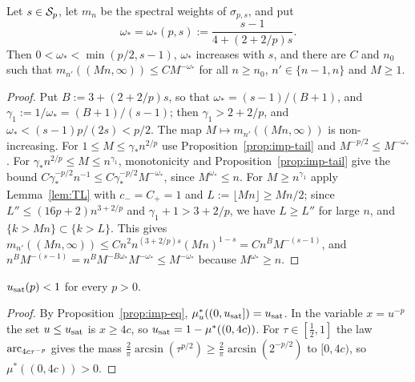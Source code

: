 \begin{lemma}\label{lem:allM}
Let $s\in\mathcal{S}_p$, let $m_n$ be the spectral weights of $\sigma_{p,s}$, and put
\[
  \omega_*=\omega_*(p,s):=\frac{s-1}{4+(2+2/p)s}.
\]
Then $0<\omega_*<\min(p/2,s-1)$, $\omega_*$ increases with $s$, and there are $C$ and $n_0$ such that
$m_{n'}((Mn,\infty))\le CM^{-\omega_*}$ for all $n\ge n_0$, $n'\in\{n-1,n\}$ and $M\ge1$.
\end{lemma}

\begin{proof}
Put $B:=3+(2+2/p)s$, so that $\omega_*=(s-1)/(B+1)$, and $\gamma_1:=1/\omega_*=(B+1)/(s-1)$; then
$\gamma_1>2+2/p$, and $\omega_*<(s-1)p/(2s)<p/2$. The map $M\mapsto m_{n'}((Mn,\infty))$ is non-increasing. For $1\le
M\le\gamma_*n^{2/p}$ use Proposition~\ref{prop:imp-tail} and $M^{-p/2}\le M^{-\omega_*}$. For $\gamma_*n^{2/p}\le M\le
n^{\gamma_1}$, monotonicity and Proposition~\ref{prop:imp-tail} give the bound $C\gamma_*^{-p/2}n^{-1}\le C\gamma_*^{-p/2}M^{-\omega_*}$,
since $M^{\omega_*}\le n$. For $M\ge n^{\gamma_1}$ apply Lemma~\ref{lem:TL} with $c_-=C_+=1$ and $L:=\lfloor Mn\rfloor\ge
Mn/2$; since $L''\le(16p+2)n^{3+2/p}$ and $\gamma_1+1>3+2/p$, we have $L\ge L''$ for large $n$, and
$\{k>Mn\}\subset\{k>L\}$. This gives $m_{n'}((Mn,\infty))\le Cn^2n^{(3+2/p)s}(Mn)^{1-s}=Cn^BM^{-(s-1)}$, and
$n^BM^{-(s-1)}=n^BM^{-B\omega_*}M^{-\omega_*}\le M^{-\omega_*}$ because $M^{\omega_*}\ge n$.
\end{proof}

\begin{lemma}\label{lem:usat}
$u_{\mathrm{sat}}(p)<1$ for every $p>0$.
\end{lemma}

\begin{proof}
By Proposition~\ref{prop:imp-eq}, $\mu^*_u((0,u_{\mathrm{sat}}])=u_{\mathrm{sat}}$. In the variable $x=u^{-p}$ the set $u\le u_{\mathrm{sat}}$ is
$x\ge4c$, so $u_{\mathrm{sat}}=1-\mu^*((0,4c))$. For $\tau\in[\frac12,1]$ the law $\operatorname{arc}_{4c\tau^{-p}}$ gives the mass
$\frac2\pi\arcsin(\tau^{p/2})\ge\frac2\pi\arcsin(2^{-p/2})$ to $[0,4c)$, so $\mu^*((0,4c))>0$.
\end{proof}
